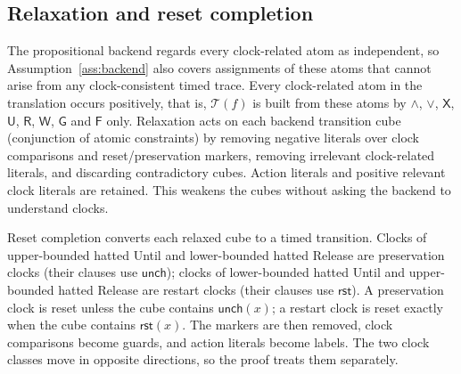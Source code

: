 \documentclass[manuscript]{acmart}
\newcommand{\Until}{\mathbin{\mathsf{U}}}
\newcommand{\Release}{\mathbin{\mathsf{R}}}
\newcommand{\Next}{\mathsf{X}}
\newcommand{\Always}{\mathsf{G}}
\newcommand{\Eventually}{\mathsf{F}}
\newcommand{\WeakUntil}{\mathbin{\mathsf{W}}}
\providecommand{\Reset}{}\renewcommand{\Reset}{\mathsf{rst}}
\newcommand{\Unch}{\mathsf{unch}}
\newcommand{\T}{\mathcal{T}}
\begin{document}
\subsection{Relaxation and reset completion}
\label{sec:reset-completion}
The propositional backend regards every clock-related atom as independent,
so Assumption~\ref{ass:backend} also covers assignments of these atoms that
cannot arise from any clock-consistent timed trace. Every clock-related atom
in the translation occurs positively, that is, $\T(f)$ is built from these
atoms by $\land$, $\lor$, $\Next$, $\Until$, $\Release$, $\WeakUntil$,
$\Always$ and $\Eventually$ only. Relaxation acts on
each backend transition cube (conjunction of atomic constraints) by removing negative literals over clock
comparisons and reset/preservation markers, removing irrelevant
clock-related literals, and discarding contradictory cubes. Action literals
and positive relevant clock literals are retained. This weakens the cubes
without asking the backend to understand clocks.

Reset completion converts each relaxed cube to a timed transition. Clocks of
upper-bounded hatted Until and lower-bounded hatted Release are preservation
clocks (their clauses use $\Unch$); clocks of lower-bounded hatted Until and
upper-bounded hatted Release are restart clocks (their clauses use $\Reset$). A
preservation clock is reset unless the cube contains $\Unch(x)$; a restart
clock is reset exactly when the cube contains $\Reset(x)$. The markers are
then removed, clock comparisons become guards, and action literals become
labels. The two clock classes move in opposite directions, so the proof
treats them separately.
\end{document}
